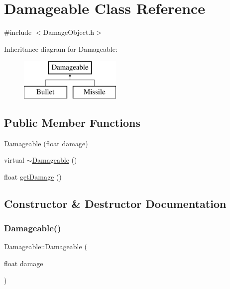 \hypertarget{class_damageable}{}\section{Damageable Class Reference}
\label{class_damageable}


{\ttfamily \#include $<$Damage\+Object.\+h$>$}

Inheritance diagram for Damageable\+:\begin{figure}[H]
\begin{center}
\leavevmode
\includegraphics[height=2.000000cm]{class_damageable}
\end{center}
\end{figure}
\subsection*{Public Member Functions}
\begin{DoxyCompactItemize}
\item 
\hyperlink{class_damageable_a429f388154f540370a2b0940e6c91d3b}{Damageable} (float damage)
\item 
virtual \hyperlink{class_damageable_a22765a2d6d315def71ad07ef125b2885}{$\sim$\+Damageable} ()
\item 
float \hyperlink{class_damageable_acb416815e3384e6386665fa70e526bbb}{get\+Damage} ()
\end{DoxyCompactItemize}


\subsection{Constructor \& Destructor Documentation}
\hypertarget{class_damageable_a429f388154f540370a2b0940e6c91d3b}{}\label{class_damageable_a429f388154f540370a2b0940e6c91d3b} 
\subsubsection{\texorpdfstring{Damageable()}{Damageable()}}
{\footnotesize\ttfamily Damageable\+::\+Damageable (\begin{DoxyParamCaption}\item[{float}]{damage }\end{DoxyParamCaption})\hspace{0.3cm}{\ttfamily [inline]}}

